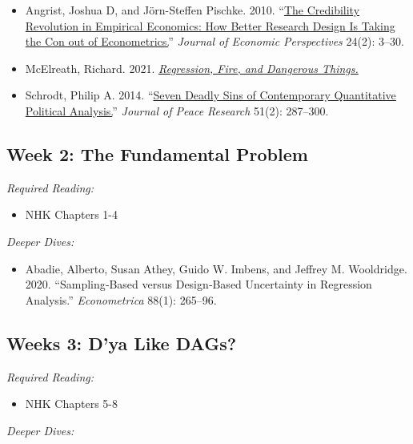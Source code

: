 \documentclass[11pt, letterpaper]{article}
\begin{document}
\begin{itemize}
	\item Angrist, Joshua D, and Jörn-Steffen Pischke. 2010. ``\href{https://pubs.aeaweb.org/doi/pdfplus/10.1257/jep.24.2.3}{The Credibility Revolution in Empirical Economics: How Better Research Design Is Taking the Con out of Econometrics.}'' \textit{Journal of Economic Perspectives} 24(2): 3–30.
	\item McElreath, Richard. 2021. \href{https://elevanth.org/blog/2021/06/15/regression-fire-and-dangerous-things-1-3/}{\textit{Regression, Fire, and Dangerous Things.}}
	\item Schrodt, Philip A. 2014. ``\href{https://journals.sagepub.com/doi/pdf/10.1177/0022343313499597}{Seven Deadly Sins of Contemporary Quantitative Political Analysis.}'' \textit{Journal of Peace Research} 51(2): 287–300.
\end{itemize}

\subsection*{Week 2: The Fundamental Problem}

\textit{Required Reading:}

\begin{itemize}
	\item NHK Chapters 1-4
\end{itemize}

\noindent \textit{Deeper Dives:}

\begin{itemize}
	\item Abadie, Alberto, Susan Athey, Guido W. Imbens, and Jeffrey M. Wooldridge. 2020. ``Sampling‐Based versus Design‐Based Uncertainty in Regression Analysis.'' \textit{Econometrica} 88(1): 265–96.
\end{itemize}

\subsection*{Weeks 3: D'ya Like DAGs?}

\textit{Required Reading:}

\begin{itemize}
	\item NHK Chapters 5-8
\end{itemize}

\noindent \textit{Deeper Dives:}
\end{document}
